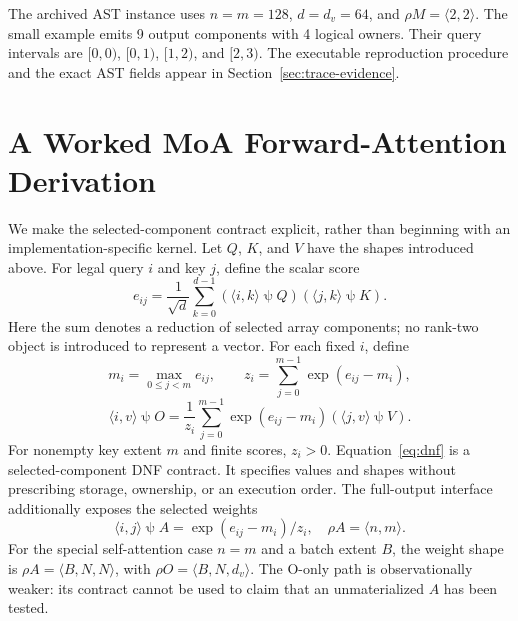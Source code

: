 \documentclass[sigplan,10pt,review,anonymous,balance=false,pbalance=false]{acmart}
\newcommand{\ps}{\mathbin{\psi}}
\begin{document}
The archived AST instance uses $n=m=128$, $d=d_v=64$, and $\rho M=\langle2,2\rangle$. The small example emits 9 output components with 4 logical owners. Their query intervals are $[0,0)$, $[0,1)$, $[1,2)$, and $[2,3)$. The executable reproduction procedure and the exact AST fields appear in Section~\ref{sec:trace-evidence}.

\section{A Worked MoA Forward-Attention Derivation}
We make the selected-component contract explicit, rather than beginning with an implementation-specific kernel. Let $Q$, $K$, and $V$ have the shapes introduced above. For legal query $i$ and key $j$, define the scalar score
\begin{equation}
 e_{ij}=\frac{1}{\sqrt d}\sum_{k=0}^{d-1}
 (\langle i,k\rangle\ps Q)(\langle j,k\rangle\ps K).
\end{equation}
Here the sum denotes a reduction of selected array components; no rank-two object is introduced to represent a vector. For each fixed $i$, define
\begin{equation}
 m_i=\max_{0\le j<m}e_{ij},\qquad
 z_i=\sum_{j=0}^{m-1}\exp(e_{ij}-m_i),
\end{equation}
\begin{equation}
 \langle i,v\rangle\ps O=\frac{1}{z_i}\sum_{j=0}^{m-1}
 \exp(e_{ij}-m_i)(\langle j,v\rangle\ps V).
 \label{eq:dnf}
\end{equation}
For nonempty key extent $m$ and finite scores, $z_i>0$. Equation~\eqref{eq:dnf} is a selected-component DNF contract. It specifies values and shapes without prescribing storage, ownership, or an execution order. The full-output interface additionally exposes the selected weights
\begin{equation}
 \langle i,j\rangle\ps A=\exp(e_{ij}-m_i)/z_i,
 \quad\rho A=\langle n,m\rangle.
\end{equation}
For the special self-attention case $n=m$ and a batch extent $B$, the weight shape is $\rho A=\langle B,N,N\rangle$, with $\rho O=\langle B,N,d_v\rangle$. The O-only path is observationally weaker: its contract cannot be used to claim that an unmaterialized $A$ has been tested.
\end{document}

